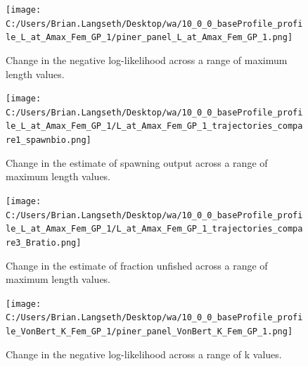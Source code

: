 \documentclass[11pt,
  english,
  a4paper,
]{article}
\begin{document}

\begin{figure}
\centering
\texttt{[image: C:/Users/Brian.Langseth/Desktop/wa/10\_0\_0\_baseProfile\_profile\_L\_at\_Amax\_Fem\_GP\_1/piner\_panel\_L\_at\_Amax\_Fem\_GP\_1.png]}
\caption{Change in the negative log-likelihood across a range of maximum length values.\label{fig:linf-profile}}
\end{figure}

\tagmcend\tagstructend


\begin{figure}
\centering
\texttt{[image: C:/Users/Brian.Langseth/Desktop/wa/10\_0\_0\_baseProfile\_profile\_L\_at\_Amax\_Fem\_GP\_1/L\_at\_Amax\_Fem\_GP\_1\_trajectories\_compare1\_spawnbio.png]}
\caption{Change in the estimate of spawning output across a range of maximum length values.\label{fig:linf-ssb}}
\end{figure}

\tagmcend\tagstructend


\begin{figure}
\centering
\texttt{[image: C:/Users/Brian.Langseth/Desktop/wa/10\_0\_0\_baseProfile\_profile\_L\_at\_Amax\_Fem\_GP\_1/L\_at\_Amax\_Fem\_GP\_1\_trajectories\_compare3\_Bratio.png]}
\caption{Change in the estimate of fraction unfished across a range of maximum length values.\label{fig:linf-depl}}
\end{figure}

\tagmcend\tagstructend


\begin{figure}
\centering
\texttt{[image: C:/Users/Brian.Langseth/Desktop/wa/10\_0\_0\_baseProfile\_profile\_VonBert\_K\_Fem\_GP\_1/piner\_panel\_VonBert\_K\_Fem\_GP\_1.png]}
\caption{Change in the negative log-likelihood across a range of k values.\label{fig:k-profile}}
\end{figure}
\end{document}
